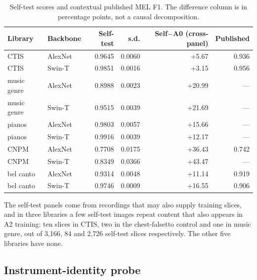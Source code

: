 \begin{table}[ht]\centering\small

\caption{Self-test scores and contextual published MEL F1. The difference column is in percentage points, not a causal decomposition.}

\begin{tabular}{llrrrr}\toprule

Library & Backbone & Self-test & s.d. & Self$-$A0 (cross-panel) & Published \\\midrule

CTIS & AlexNet & 0.9645 & 0.0060 & +5.67 & 0.936 \\

CTIS & Swin-T & 0.9851 & 0.0016 & +3.15 & 0.956 \\

music genre & AlexNet & 0.8988 & 0.0023 & +20.99 & --- \\

music genre & Swin-T & 0.9515 & 0.0039 & +21.69 & --- \\

pianos & AlexNet & 0.9803 & 0.0057 & +15.66 & --- \\

pianos & Swin-T & 0.9916 & 0.0039 & +12.17 & --- \\

CNPM & AlexNet & 0.7708 & 0.0175 & +36.43 & 0.742 \\

CNPM & Swin-T & 0.8349 & 0.0366 & +43.47 & --- \\

bel canto & AlexNet & 0.9314 & 0.0048 & +11.14 & 0.919 \\

bel canto & Swin-T & 0.9746 & 0.0009 & +16.55 & 0.906 \\

\bottomrule\end{tabular}\end{table}

The self-test panels come from recordings that may also supply training slices,
and in three libraries a few self-test images repeat content that also appears in A2 training:
ten slices in CTIS, two in the chest-falsetto control and one in music genre, out of 3{,}166, 84
and 2{,}726 self-test slices respectively. The other five libraries have none.

\subsection{Instrument-identity probe}

